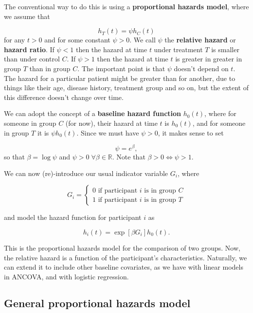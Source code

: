 \documentclass[
  openany]{book}
\theoremstyle{definition}
\theoremstyle{definition}
\theoremstyle{definition}
\theoremstyle{definition}
\theoremstyle{remark}
\begin{document}
The conventional way to do this is using a \textbf{proportional hazards model}, where we assume that

\[h_T\left(t\right) = \psi h_C\left(t\right) \]
for any \(t>0\) and for some constant \(\psi>0\). We call \(\psi\) the \textbf{relative hazard} or \textbf{hazard ratio}. If \(\psi<1\) then the hazard at time \(t\) under treatment \(T\) is smaller than under control \(C\). If \(\psi>1\) then the hazard at time \(t\) is greater in greater in group \(T\) than in group \(C\). The important point is that \(\psi\) doesn't depend on \(t\). The hazard for a particular patient might be greater than for another, due to things like their age, disease history, treatment group and so on, but the extent of this difference doesn't change over time.

We can adopt the concept of a \textbf{baseline hazard function} \(h_0\left(t\right)\), where for someone in group \(C\) (for now), their hazard at time \(t\) is \(h_0\left(t\right)\), and for someone in group \(T\) it is \(\psi h_0\left(t\right)\). Since we must have \(\psi>0\), it makes sense to set

\[\psi = e^{\beta},\]
so that \(\beta = \log\psi\) and \(\psi>0\;\forall\beta\in\mathbb{R}\). Note that \(\beta>0 \iff \psi>1\).

We can now (re)-introduce our usual indicator variable \(G_i\), where

\[ 
G_i = 
\begin{cases}
0\text{  if participant }i\text{ is in group }C\\
1\text{  if participant }i\text{ is in group }T
\end{cases}
\]

and model the hazard function for participant \(i\) as

\[h_i\left(t\right) = \exp\left[\beta G_i\right]h_0\left(t\right).\]

This is the proportional hazards model for the comparison of two groups. Now, the relative hazard is a function of the participant's characteristics. Naturally, we can extend it to include other baseline covariates, as we have with linear models in ANCOVA, and with logistic regression.

\hypertarget{general-proportional-hazards-model}{%
\subsection{General proportional hazards model}\label{general-proportional-hazards-model}}
\end{document}
